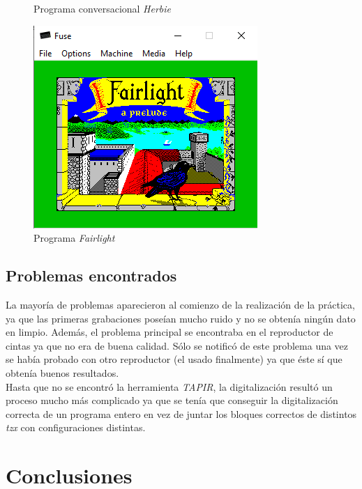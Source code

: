 \documentclass{article}
\begin{document}
\begin{figure}[!htb]
\begin{minipage}{0.32\textwidth}
     \caption{Programa conversacional \textit{Herbie} }\label{Fig:Herbie}
   \end{minipage}
  \includegraphics[width=\linewidth]{images/fairlight.png}
  \caption{Programa \textit{Fairlight}}\label{fig:fairlight}
\endminipage
\end{figure}

\subsection{Problemas encontrados} 
La mayoría de problemas aparecieron al comienzo de la realización de la práctica, ya que las primeras grabaciones poseían mucho ruido y no se obtenía ningún dato en limpio. Además, el problema principal se encontraba en el reproductor de cintas ya que no era de buena calidad. Sólo se notificó de este problema una vez se había probado con otro reproductor (el usado finalmente) ya que éste sí que obtenía buenos resultados. \\

Hasta que no se encontró la herramienta \textit{TAPIR}, la digitalización resultó un proceso mucho más complicado ya que se tenía que conseguir la digitalización correcta de un programa entero en vez de juntar los bloques correctos de distintos \textit{tzx} con configuraciones distintas.


\section{Conclusiones}
\end{document}
